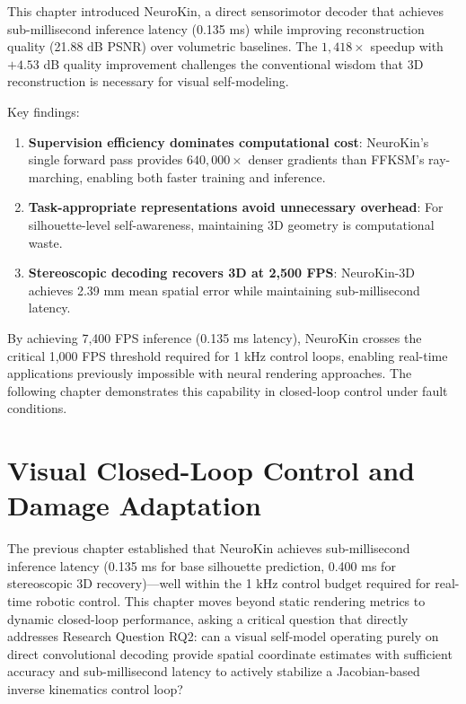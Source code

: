 ﻿\documentclass[12pt,a4paper,oneside]{report}
\begin{document}
This chapter introduced NeuroKin, a direct sensorimotor decoder that achieves sub-millisecond inference latency (0.135 ms) while improving reconstruction quality (21.88 dB PSNR) over volumetric baselines. The $1,418\times$ speedup with $+4.53$ dB quality improvement challenges the conventional wisdom that 3D reconstruction is necessary for visual self-modeling.

Key findings:

\begin{enumerate}
    \item \textbf{Supervision efficiency dominates computational cost}: NeuroKin's single forward pass provides $640,000\times$ denser gradients than FFKSM's ray-marching, enabling both faster training and inference.
    \item \textbf{Task-appropriate representations avoid unnecessary overhead}: For silhouette-level self-awareness, maintaining 3D geometry is computational waste.
    \item \textbf{Stereoscopic decoding recovers 3D at 2,500 FPS}: NeuroKin-3D achieves 2.39 mm mean spatial error while maintaining sub-millisecond latency.
\end{enumerate}

By achieving 7,400 FPS inference (0.135 ms latency), NeuroKin crosses the critical 1,000 FPS threshold required for 1 kHz control loops, enabling real-time applications previously impossible with neural rendering approaches. The following chapter demonstrates this capability in closed-loop control under fault conditions.

\chapter{Visual Closed-Loop Control and Damage Adaptation}

The previous chapter established that NeuroKin achieves sub-millisecond inference latency (0.135 ms for base silhouette prediction, 0.400 ms for stereoscopic 3D recovery)---well within the 1 kHz control budget required for real-time robotic control. This chapter moves beyond static rendering metrics to dynamic closed-loop performance, asking a critical question that directly addresses Research Question RQ2: can a visual self-model operating purely on direct convolutional decoding provide spatial coordinate estimates with sufficient accuracy and sub-millisecond latency to actively stabilize a Jacobian-based inverse kinematics control loop?
\end{document}
